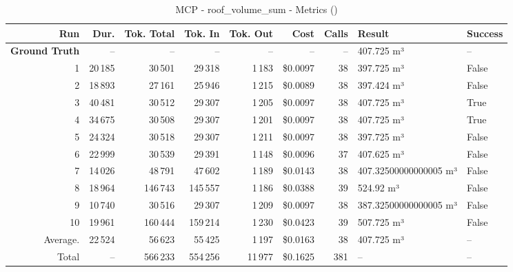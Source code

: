 \documentclass[a4paper,11pt]{article}
\begin{document}
\begin{table}[ht]
\centering
\scriptsize
\caption{MCP - roof\_volume\_sum - Metrics ()}
\label{tab:mcp\_roof\_volume\_sum\_metrics\_}
\begin{tabular}{r r r r r r r p{3cm} l}
\hline
Run & Dur. & Tok. Total & Tok. In & Tok. Out & Cost & Calls & Result & Success \\
\hline
\textbf{Ground Truth} & -- & -- & -- & -- & -- & -- & 407.725 m³ & -- \\
\hline
1 & 20\,185 & 30\,501 & 29\,318 & 1\,183 & \$0.0097 & 38 & 397.725 m³ & False \\
2 & 18\,893 & 27\,161 & 25\,946 & 1\,215 & \$0.0089 & 38 & 397.424 m³ & False \\
3 & 40\,481 & 30\,512 & 29\,307 & 1\,205 & \$0.0097 & 38 & 407.725 m³ & True \\
4 & 34\,675 & 30\,508 & 29\,307 & 1\,201 & \$0.0097 & 38 & 407.725 m³ & True \\
5 & 24\,324 & 30\,518 & 29\,307 & 1\,211 & \$0.0097 & 38 & 397.725 m³ & False \\
6 & 22\,999 & 30\,539 & 29\,391 & 1\,148 & \$0.0096 & 37 & 407.625 m³ & False \\
7 & 14\,026 & 48\,791 & 47\,602 & 1\,189 & \$0.0143 & 38 & 407.32500000000005 m³ & False \\
8 & 18\,964 & 146\,743 & 145\,557 & 1\,186 & \$0.0388 & 39 & 524.92 m³ & False \\
9 & 10\,740 & 30\,516 & 29\,307 & 1\,209 & \$0.0097 & 38 & 387.32500000000005 m³ & False \\
10 & 19\,961 & 160\,444 & 159\,214 & 1\,230 & \$0.0423 & 39 & 507.725 m³ & False \\
\hline
Average. & 22\,524 & 56\,623 & 55\,425 & 1\,197 & \$0.0163 & 38 & 407.725 m³ & -- \\
Total & -- & 566\,233 & 554\,256 & 11\,977 & \$0.1625 & 381 & -- & -- \\
\hline
\end{tabular}
\end{table}

\clearpage
\end{document}
